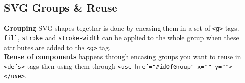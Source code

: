 \documentclass[a4paper,11pt]{article}
\begin{document}
\subsection{SVG Groups \& Reuse}
\textbf{Grouping} SVG shapes together is done by encasing them in a set of \verb|<g>| tags. \verb|fill|, \verb|stroke| and \verb|stroke-width| can be applied to the whole group when these attributes are added to the \verb|<g>| tag.\\
\textbf{Reuse of components} happens through encasing groups you want to reuse in \verb|<defs>| tags then using them through \verb|<use href="#idOfGroup" x="" y=""></use>|.
\end{document}
